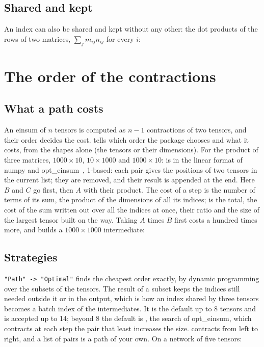 \documentclass[11pt,a4paper]{article}
\begin{document}
\subsection{Shared and kept}
An index can also be shared and kept without any other: the dot products of the rows of two matrices,
$\sum_jm_{ij}n_{ij}$ for every $i$:

\section{The order of the contractions}\label{sec:order}

\subsection{What a path costs}
An einsum of $n$ tensors is computed as $n-1$ contractions of two tensors, and their order decides the cost.
 tells which order the package chooses and what it costs, from the shapes alone (the tensors or their
dimensions). For the product of three matrices, $1000\times10$, $10\times1000$ and $1000\times10$:
 is in the linear format of numpy and opt\_einsum~\cite{SG18}, 1-based: each pair gives the positions of two
tensors in the current list; they are removed, and their result is appended at the end. Here $B$ and $C$ go first,
then $A$ with their product. The cost of a step is the number of terms of its sum, the product of the dimensions of all its
indices;  is the total,  the cost of the sum written out over all the indices at once,
 their ratio and  the size of the largest tensor built on the way. Taking $A$ times
$B$ first costs a hundred times more, and builds a $1000\times1000$ intermediate:

\subsection{Strategies}
\texttt{"Path" -> "Optimal"} finds the cheapest order exactly, by dynamic programming over the subsets of the tensors. The
result of a subset keeps the indices still needed outside it or in the output, which is how an index shared by three
tensors becomes a batch index of the intermediates. It is the default up to 8 tensors and is accepted up to 14; beyond 8
the default is , the search of opt\_einsum, which contracts at each step the pair that least increases the size.
 contracts from left to right, and a list of pairs is a path of your own. On a network of five tensors:
\end{document}
